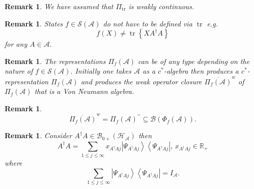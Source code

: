 \documentclass[aps,preprint]{revtex4}%
\newtheorem{remark}[theorem]{Remark}
\begin{document}
\begin{remark}
We have assumed that $\Pi_{\operatorname*{tr}}$ is weakly continuous.
\end{remark}

\begin{remark}
States $f\in\mathcal{S}\left(  \mathcal{A}\right)  $ do not have to be defined
via $\operatorname*{tr}$ e.g.%
\begin{equation}
f\left(  X\right)  \neq\operatorname*{tr}\left\{  XA^{\dagger}A\right\}
\end{equation}
for any $A\in\mathcal{A}.$
\end{remark}

\begin{remark}
The representations $\Pi_{f}\left(  \mathcal{A}\right)  $ can be of \emph{any
type} depending on the nature of $f\in\mathcal{S}\left(  \mathcal{A}\right)
.$ Initially one takes $\mathcal{A}$ as a $c^{\ast}$-algebra then produces a
$c^{\ast}$-representation $\Pi_{f}\left(  \mathcal{A}\right)  $ and produces
the weak operator closure $\overline{\Pi_{f}\left(  \mathcal{A}\right)  }^{w}$
of $\Pi_{f}\left(  \mathcal{A}\right)  $ that is a Von Neumann algebra.
\end{remark}

\begin{remark}%
\begin{equation}
\overline{\Pi_{f}\left(  \mathcal{A}\right)  }^{w}=\Pi_{f}\left(
\mathcal{A}\right)  ^{\prime\prime}\subseteq\mathcal{B}\left(  \Phi_{f}\left(
\mathcal{A}\right)  \right)  .
\end{equation}

\end{remark}

\begin{remark}
Consider $A^{\dagger}A\in\mathcal{B}_{0+}\left(  \mathcal{H}_{\mathcal{A}%
}\right)  $ then
\begin{equation}
A^{\dagger}A=\sum_{1\leq j\leq\infty}x_{A^{\dagger}Aj}\left\vert
\Psi_{A^{\dagger}Aj}\right\rangle \left\langle \Psi_{A^{\dagger}Aj}\right\vert
,\,x_{A^{\dagger}Aj}\in\mathbb{R}_{+}%
\end{equation}
where
\begin{equation}
\sum_{1\leq j\leq\infty}\left\vert \Psi_{A^{\dagger}Aj}\right\rangle
\left\langle \Psi_{A^{\dagger}Aj}\right\vert =I_{\mathcal{A}}.
\end{equation}

\end{remark}
\end{document}
